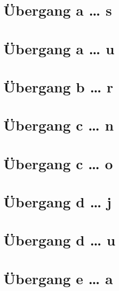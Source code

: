 \documentclass[a4paper,landscape]{article}
\begin{document}
\hspace*{-1ex}
\newpage

\section{Übergang a … s }

\hspace*{-1ex}
\newpage

\section{Übergang a … u }

\hspace*{-1ex}
\newpage

\section{Übergang b … r }

\hspace*{-1ex}
\newpage

\section{Übergang c … n }

\hspace*{-1ex}
\newpage

\section{Übergang c … o }

\hspace*{-1ex}
\newpage

\section{Übergang d … j }

\hspace*{-1ex}
\newpage

\section{Übergang d … u }

\hspace*{-1ex}
\newpage


\section{Übergang e … a }
\end{document}

